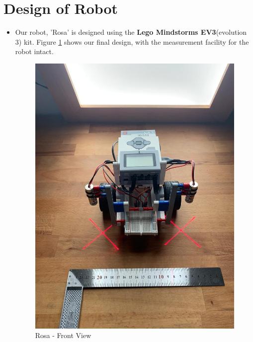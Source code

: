    \section{Design of Robot}
    {
    \begin{itemize}
        \item Our robot, 'Rosa' is designed using the \textbf{Lego Mindstorms EV3}(evolution 3) kit. Figure \ref{fig:Rosa front view} shows our final design, with the measurement facility for the robot intact. 
        
        \begin{figure}[!ht] %
            \centering
            \includegraphics[scale=0.2]{images/FrontView.jpeg}
            \caption{Rosa - Front View}
            \label{fig:Rosa front view}
        \end{figure}
        

\end{itemize}}
